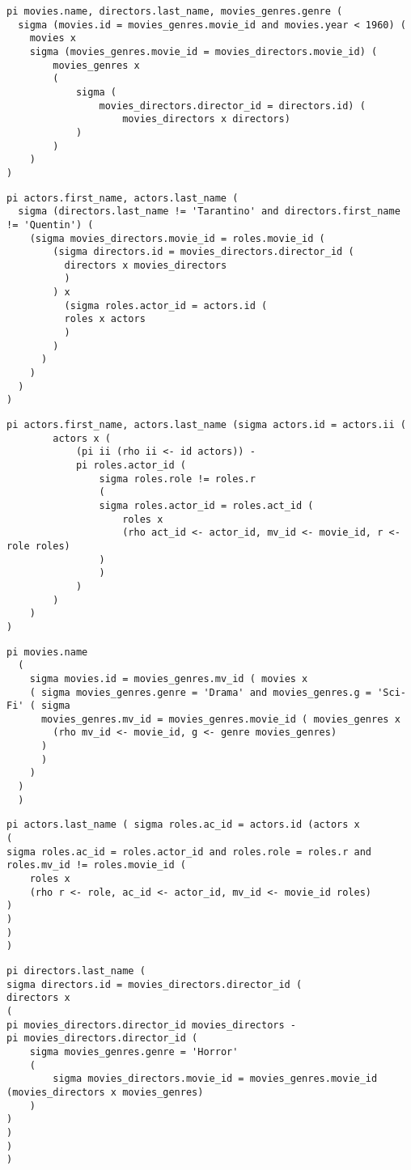 \documentclass{article}
\begin{document}
\begin{solution}$ $

\begin{lstlisting}[mathescape=true]
pi movies.name, directors.last_name, movies_genres.genre (
  sigma (movies.id = movies_genres.movie_id and movies.year < 1960) (
	movies x 
	sigma (movies_genres.movie_id = movies_directors.movie_id) (
		movies_genres x
		(
			sigma (
				movies_directors.director_id = directors.id) (
					movies_directors x directors)
			)
		)
	)
)
  \end{lstlisting}

\begin{lstlisting}
pi actors.first_name, actors.last_name (
  sigma (directors.last_name != 'Tarantino' and directors.first_name != 'Quentin') (
    (sigma movies_directors.movie_id = roles.movie_id (
	    (sigma directors.id = movies_directors.director_id (
          directors x movies_directors
          )
        ) x 
	      (sigma roles.actor_id = actors.id (
          roles x actors
          )
        )
      )   
    )
  )
)
\end{lstlisting}

\begin{lstlisting}
pi actors.first_name, actors.last_name (sigma actors.id = actors.ii (
		actors x (
			(pi ii (rho ii <- id actors)) - 
			pi roles.actor_id (
				sigma roles.role != roles.r
				(
				sigma roles.actor_id = roles.act_id (
					roles x
					(rho act_id <- actor_id, mv_id <- movie_id, r <- role roles)
				)
				)
			)
		)
	)
)
\end{lstlisting}

\begin{lstlisting}
pi movies.name
  (
    sigma movies.id = movies_genres.mv_id ( movies x 
    ( sigma movies_genres.genre = 'Drama' and movies_genres.g = 'Sci-Fi' ( sigma 
      movies_genres.mv_id = movies_genres.movie_id ( movies_genres x 
        (rho mv_id <- movie_id, g <- genre movies_genres)
      )
      )
    )
  )
  )
\end{lstlisting}

\begin{lstlisting}
pi actors.last_name ( sigma roles.ac_id = actors.id (actors x 
(
sigma roles.ac_id = roles.actor_id and roles.role = roles.r and roles.mv_id != roles.movie_id (
	roles x
	(rho r <- role, ac_id <- actor_id, mv_id <- movie_id roles)
)
)
)
)
\end{lstlisting}

\begin{lstlisting}
pi directors.last_name (
sigma directors.id = movies_directors.director_id (
directors x 
(
pi movies_directors.director_id movies_directors - 
pi movies_directors.director_id (
	sigma movies_genres.genre = 'Horror' 
	(
		sigma movies_directors.movie_id = movies_genres.movie_id (movies_directors x movies_genres)
	)
)
)
) 
)
\end{lstlisting}


\end{solution}
\end{document}
